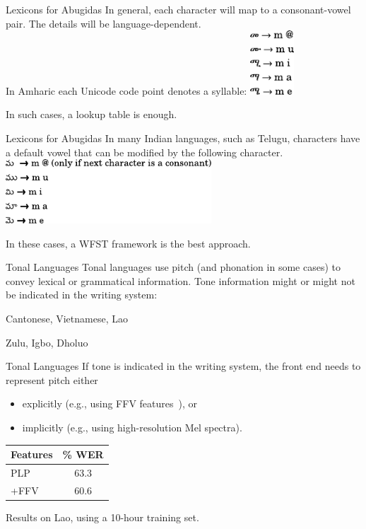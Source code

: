 \begin{frame}{Lexicons for Abugidas}{}
In general, each character will map to a consonant-vowel pair.  The
details will be language-dependent. \\
In Amharic each Unicode code point denotes a syllable:
\vfill
\centering
\includegraphics[height=24mm]{figures/Amharic}
\vfill
\raggedright
In such cases, a lookup table is enough.
\end{frame}

\begin{frame}{Lexicons for Abugidas}{}
In many Indian languages, such as Telugu, characters have a
default vowel that can be modified by the following character.
\vfill
\centering
\includegraphics[height=24mm]{figures/Telugu}
\vfill
\raggedright
In these cases, a WFST framework is the best approach.
\vfill
{}
\end{frame}

\begin{frame}{Tonal Languages}{}
  \alert{Tonal} languages use pitch (and phonation in some cases)
  to convey lexical or grammatical information.  Tone information
  might or might not be indicated in the writing system:
  \vfill
  \begin{description}
  \item[Written] Cantonese, Vietnamese, Lao
  \item[Not written] Zulu, Igbo, Dholuo
  \end{description}
\end{frame}

\begin{frame}{Tonal Languages}{}
  If tone is indicated in the writing system, the front end needs to
  represent pitch either
  \begin{itemize}
  \item explicitly (e.g., using FFV features~\cite{Laskowski2008}), or
  \item implicitly (e.g., using high-resolution Mel spectra).
  \end{itemize}
  \vfill
  \centering
  \begin{tabular}{@{}lc@{}} \toprule
    {\bf Features} & {\bf \% WER} \\ \midrule
    PLP & 63.3 \\
    +FFV & 60.6 \\ \bottomrule
  \end{tabular}
  \vfill
  \raggedright
  Results on Lao, using a 10-hour training set.
\end{frame}

